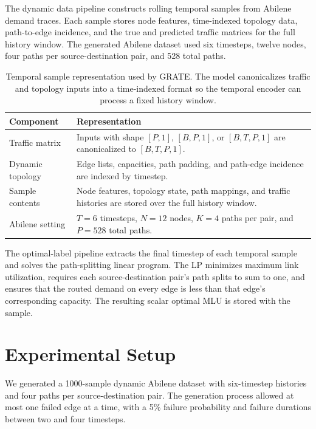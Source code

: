 \documentclass[letterpaper,twocolumn,10pt]{article}
\begin{document}
The dynamic data pipeline constructs rolling temporal samples from Abilene demand traces. Each sample stores node features, time-indexed topology data, path-to-edge incidence, and the true and predicted traffic matrices for the full history window. The generated Abilene dataset used six timesteps, twelve nodes, four paths per source-destination pair, and 528 total paths.

\begin{table}[t]
\centering
\small
\begin{tabular}{lp{}}
\hline
Component & Representation \\
\hline
Traffic matrix & Inputs with shape \([P,1]\), \([B,P,1]\), or \([B,T,P,1]\) are canonicalized to \([B,T,P,1]\). \\
Dynamic topology & Edge lists, capacities, path padding, and path-edge incidence are indexed by timestep. \\
Sample contents & Node features, topology state, path mappings, and traffic histories are stored over the full history window. \\
Abilene setting & \(T=6\) timesteps, \(N=12\) nodes, \(K=4\) paths per pair, and \(P=528\) total paths. \\
\hline
\end{tabular}
\caption{Temporal sample representation used by GRATE. The model canonicalizes traffic and topology inputs into a time-indexed format so the temporal encoder can process a fixed history window.}
\label{tab:temporal-sample-representation}
\end{table}

The optimal-label pipeline extracts the final timestep of each temporal sample and solves the path-splitting linear program. The LP minimizes maximum link utilization, requires each source-destination pair's path splits to sum to one, and ensures that the routed demand on every edge is less than that edge's corresponding capacity. The resulting scalar optimal MLU is stored with the sample.

\section{Experimental Setup}

We generated a 1000-sample dynamic Abilene dataset with six-timestep histories and four paths per source-destination pair. The generation process allowed at most one failed edge at a time, with a 5\% failure probability and failure durations between two and four timesteps.
\end{document}
